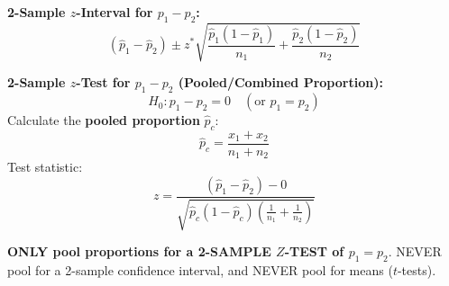 \begin{formulabox}
\textbf{2-Sample $z$-Interval for $p_1 - p_2$:}
\[
(\hat{p}_1 - \hat{p}_2) \pm z^* \sqrt{\frac{\hat{p}_1(1-\hat{p}_1)}{n_1} + \frac{\hat{p}_2(1-\hat{p}_2)}{n_2}}
\]

\textbf{2-Sample $z$-Test for $p_1 - p_2$ (Pooled/Combined Proportion):}
\[
H_0: p_1 - p_2 = 0 \quad (\text{or } p_1 = p_2)
\]
Calculate the \textbf{pooled proportion} $\hat{p}_c$:
\[
\hat{p}_c = \frac{x_1 + x_2}{n_1 + n_2}
\]
Test statistic:
\[
z = \frac{(\hat{p}_1 - \hat{p}_2) - 0}{\sqrt{\hat{p}_c(1-\hat{p}_c)\left(\frac{1}{n_1} + \frac{1}{n_2}\right)}}
\]
\end{formulabox}

\begin{trapbox}
\textbf{ONLY pool proportions for a 2-SAMPLE $Z$-TEST of $p_1 = p_2$}. NEVER pool for a 2-sample confidence interval, and NEVER pool for means ($t$-tests).
\end{trapbox}
